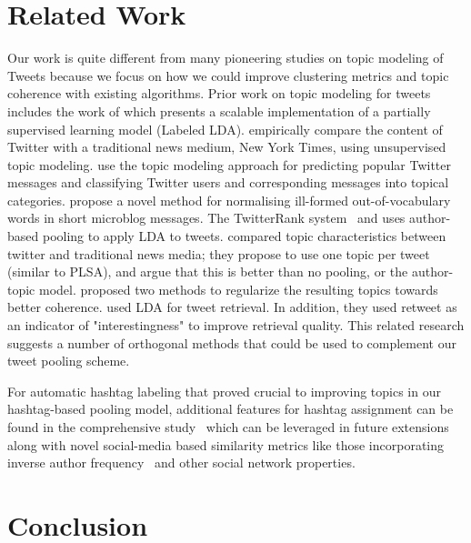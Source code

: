 \documentclass{sig-alternate}
\begin{document}
\section{Related Work}

\label{sec:related_work}

Our work is quite different from many pioneering studies
on topic modeling of Tweets because we focus on how we could
improve clustering metrics and topic coherence with existing algorithms.
Prior work on topic modeling for tweets includes the work of
\cite{ramage} which presents a scalable implementation of a partially
supervised learning model (Labeled LDA).
\cite{wayne} empirically compare the content of
Twitter with a traditional news medium, New York Times, using
unsupervised topic modeling. \cite{hong} use the topic modeling
approach for predicting popular Twitter messages and classifying
Twitter users and corresponding messages into topical
categories. \cite{han2012tist} propose a novel method for normalising
ill-formed out-of-vocabulary words in short microblog messages.  The
{T}witterRank system~\cite{Weng2010wsdm} and \cite{hong} uses
author-based pooling to apply LDA to tweets. \cite{wayne} compared
topic characteristics between twitter and traditional news media; they
propose to use one topic per tweet (similar to PLSA), and argue that
this is better than no pooling, or the author-topic model.
\cite{newman11} proposed two methods to regularize the
resulting topics towards better coherence.
\cite{Naveed2011cikm} used LDA for tweet retrieval. In addition, they
used retweet as an indicator of "interestingness" to improve retrieval
quality.  This related research suggests a number of orthogonal
methods that could be used to complement our tweet pooling scheme.

For automatic hashtag labeling that proved crucial to improving topics
in our hashtag-based pooling model, additional features for hashtag
assignment can be found in the comprehensive study~\cite{yang2012www}
which can be leveraged in future extensions along with novel 
social-media based similarity metrics like those incorporating inverse
author frequency~\cite{iaf} and other social network properties.

\section{Conclusion}
\end{document}
